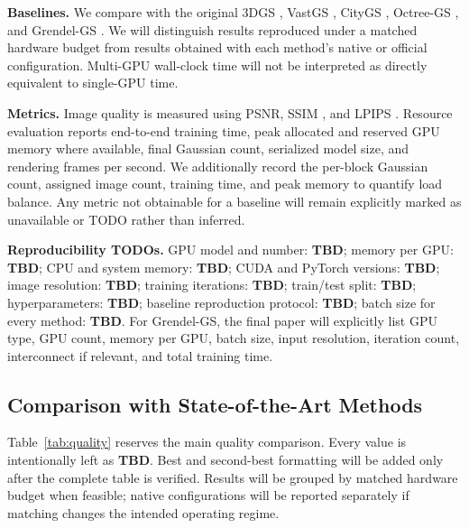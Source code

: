 \documentclass[conference]{IEEEtran}
\newcommand{\TBD}{\textbf{TBD}}
\begin{document}
\textbf{Baselines.} We compare with the original 3DGS \cite{kerbl2023gaussiansplatting}, VastGS \cite{lin2024vastgaussian}, CityGS \cite{liu2024citygaussian}, Octree-GS \cite{ren2024octreegs}, and Grendel-GS \cite{zhao2025scaling3dgs}. We will distinguish results reproduced under a matched hardware budget from results obtained with each method's native or official configuration. Multi-GPU wall-clock time will not be interpreted as directly equivalent to single-GPU time.

\textbf{Metrics.} Image quality is measured using PSNR, SSIM \cite{wang2004ssim}, and LPIPS \cite{zhang2018lpips}. Resource evaluation reports end-to-end training time, peak allocated and reserved GPU memory where available, final Gaussian count, serialized model size, and rendering frames per second. We additionally record the per-block Gaussian count, assigned image count, training time, and peak memory to quantify load balance. Any metric not obtainable for a baseline will remain explicitly marked as unavailable or TODO rather than inferred.

\textbf{Reproducibility TODOs.} GPU model and number: \TBD; memory per GPU: \TBD; CPU and system memory: \TBD; CUDA and PyTorch versions: \TBD; image resolution: \TBD; training iterations: \TBD; train/test split: \TBD; hyperparameters: \TBD; baseline reproduction protocol: \TBD; batch size for every method: \TBD. For Grendel-GS, the final paper will explicitly list GPU type, GPU count, memory per GPU, batch size, input resolution, iteration count, interconnect if relevant, and total training time.

\subsection{Comparison with State-of-the-Art Methods}

Table~\ref{tab:quality} reserves the main quality comparison. Every value is intentionally left as \TBD. Best and second-best formatting will be added only after the complete table is verified. Results will be grouped by matched hardware budget when feasible; native configurations will be reported separately if matching changes the intended operating regime.
\end{document}
